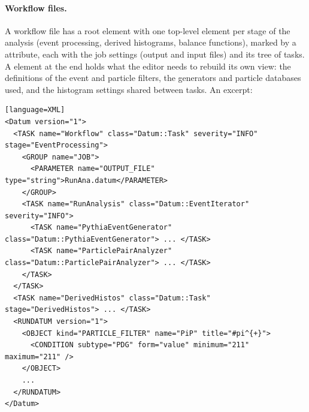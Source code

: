 \paragraph{Workflow files.}
A workflow file has a  root element with one top-level  element per stage of the analysis (event
processing, derived histograms, balance functions), marked by a  attribute, each with the job settings
(output and input files) and its tree of tasks. A  element at the end holds what the editor needs to rebuild
its own view: the definitions of the event and particle filters, the generators and particle databases used, and the
histogram settings shared between tasks. An excerpt:
\begin{widetext}
\begin{verbatim}[language=XML]
<Datum version="1">
  <TASK name="Workflow" class="Datum::Task" severity="INFO" stage="EventProcessing">
    <GROUP name="JOB">
      <PARAMETER name="OUTPUT_FILE" type="string">RunAna.datum</PARAMETER>
    </GROUP>
    <TASK name="RunAnalysis" class="Datum::EventIterator" severity="INFO">
      <TASK name="PythiaEventGenerator" class="Datum::PythiaEventGenerator"> ... </TASK>
      <TASK name="ParticlePairAnalyzer" class="Datum::ParticlePairAnalyzer"> ... </TASK>
    </TASK>
  </TASK>
  <TASK name="DerivedHistos" class="Datum::Task" stage="DerivedHistos"> ... </TASK>
  <RUNDATUM version="1">
    <OBJECT kind="PARTICLE_FILTER" name="PiP" title="#pi^{+}">
      <CONDITION subtype="PDG" form="value" minimum="211" maximum="211" />
    </OBJECT>
    ...
  </RUNDATUM>
</Datum>
\end{verbatim}
\end{widetext}